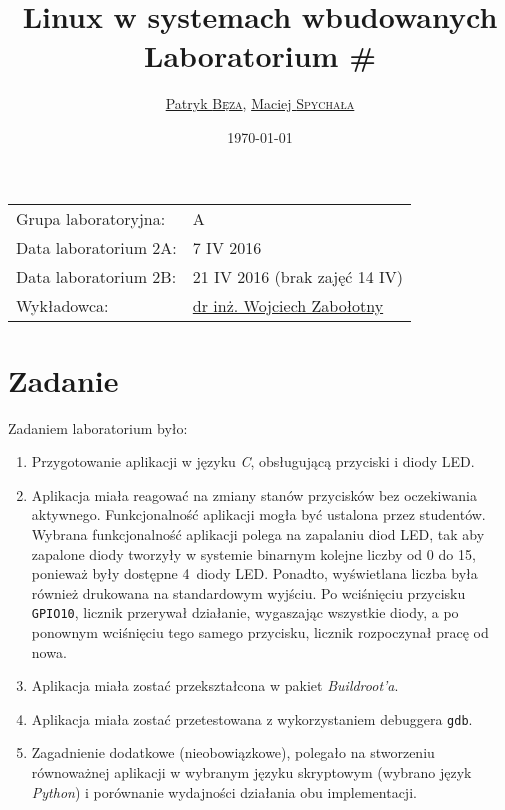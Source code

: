 \documentclass{article}
\title{Linux w systemach wbudowanych\\Laboratorium \#\labnumber}
\author{\href{mailto:bezap@student.mini.pw.edu.pl}{Patryk \textsc{Bęza}}, \href{mailto:spychalam@student.mini.pw.edu.pl}{Maciej \textsc{Spychała}}}
\date{\today}
\newcommand{\labnumber}{2}
\begin{document}
\maketitle

\begin{center}
\begin{tabular}{ll}
Grupa laboratoryjna: & A\\
Data laboratorium \labnumber A: & 7 IV 2016\\
Data laboratorium \labnumber B: & 21 IV 2016 (brak zajęć 14 IV)\\
Wykładowca: & \href{mailto:wzab@ise.pw.edu.pl}{dr inż. Wojciech Zabołotny}
\end{tabular}
\end{center}



\section{Zadanie}
\label{task}

Zadaniem laboratorium było:
\begin{enumerate}
\item Przygotowanie aplikacji w języku \emph{C}, obsługującą przyciski i diody LED.
\item Aplikacja miała reagować na zmiany stanów przycisków bez oczekiwania aktywnego. Funkcjonalność aplikacji mogła być ustalona przez studentów. Wybrana funkcjonalność aplikacji polega na zapalaniu diod LED, tak aby zapalone diody tworzyły w systemie binarnym kolejne liczby od 0 do 15, ponieważ były dostępne 4~diody LED. Ponadto, wyświetlana liczba była również drukowana na standardowym wyjściu. Po wciśnięciu przycisku \texttt{GPIO10}, licznik przerywał działanie, wygaszając wszystkie diody, a po ponownym wciśnięciu tego samego przycisku, licznik rozpoczynał pracę od nowa.
\item Aplikacja miała zostać przekształcona w pakiet \emph{Buildroot'a}.
\item Aplikacja miała zostać przetestowana z wykorzystaniem debuggera \texttt{gdb}.
\item Zagadnienie dodatkowe (nieobowiązkowe), polegało na stworzeniu równoważnej aplikacji w wybranym języku skryptowym (wybrano język \emph{Python}) i porównanie wydajności działania obu implementacji.
\end{enumerate}
\end{document}
